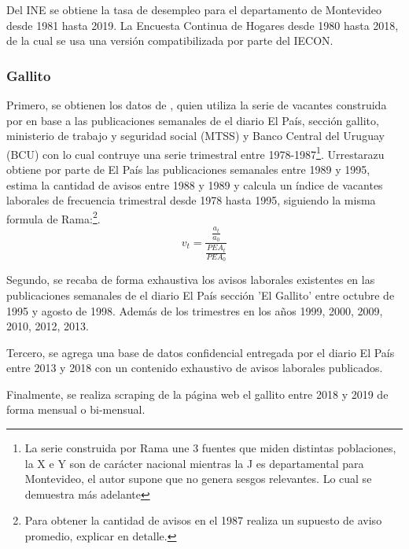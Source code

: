 Del INE se obtiene la tasa de desempleo para el departamento de Montevideo desde 1981 hasta 2019.
La Encuesta Continua de Hogares desde 1980 hasta 2018, de la cual se usa una versión compatibilizada por parte del IECON.

\subsubsection*{Gallito}
Primero, se obtienen los datos de \cite{Urrestarazu1997}, quien utiliza la serie de vacantes construida por \cite{Rama1988} en base a las publicaciones semanales de el diario El País, sección gallito, ministerio de trabajo y seguridad social (MTSS) y Banco Central del Uruguay (BCU) con lo cual contruye una serie trimestral entre 1978-1987\footnote{La serie construida por Rama une 3 fuentes que miden distintas poblaciones, la  X e Y son de carácter nacional mientras la J es departamental para Montevideo, el autor supone que no genera sesgos relevantes. Lo cual se demuestra más adelante}. Urrestarazu obtiene por parte de El País las publicaciones semanales entre 1989 y 1995, estima la cantidad de avisos entre 1988 y 1989 y calcula un índice de vacantes laborales de frecuencia trimestral desde 1978 hasta 1995, siguiendo la misma formula de Rama:\footnote{Para obtener la cantidad de avisos en el 1987 realiza un supuesto de aviso promedio, explicar en detalle.}.
\begin{equation}
v_t = \frac{\frac{a_t}{a_0}}{\frac{PEA_t}{PEA_0}}
\end{equation}

Segundo, se recaba de forma exhaustiva los avisos laborales existentes en las publicaciones semanales de el diario El País sección 'El Gallito' entre octubre de 1995 y agosto de 1998. Además de los trimestres en los años 1999, 2000, 2009, 2010, 2012, 2013.

Tercero, se agrega una base de datos confidencial entregada por el diario El País entre 2013 y 2018 con un contenido exhaustivo de avisos laborales publicados.

Finalmente, se realiza scraping de la página web el gallito entre 2018 y 2019 de forma mensual o bi-mensual.

